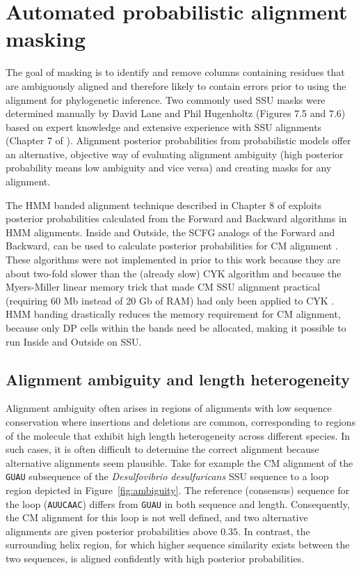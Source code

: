 \section{Automated probabilistic alignment masking}

The goal of masking is to identify and remove columns containing
residues that are ambiguously aligned and therefore likely to contain
errors prior to using the alignment for phylogenetic inference.  Two
commonly used SSU masks were determined manually by David Lane and
Phil Hugenholtz (Figures 7.5 and 7.6) based on expert knowledge and extensive
experience with SSU alignments (Chapter 7 of \cite{Nawrocki09b}). Alignment posterior
probabilities from probabilistic models offer an alternative,
objective way of evaluating alignment ambiguity (high posterior
probability means low ambiguity and vice versa) and creating masks for
any alignment.

The HMM banded alignment technique described in Chapter 8 of
\cite{Nawrocki09b} exploits
posterior probabilities calculated from the Forward and Backward
algorithms in HMM alignments. Inside and Outside, the
SCFG analogs of the Forward and Backward, can be used to calculate
posterior probabilities for CM alignment \cite{Durbin98}. These
algorithms were not implemented in  prior to this work
because they are about two-fold slower than the (already slow) CYK
algorithm and because the Myers-Miller linear memory trick that made
CM SSU alignment practical (requiring 60 Mb instead of 20 Gb of RAM)
had only been applied to CYK \cite{Eddy02b}. HMM banding drastically
reduces the memory requirement for CM alignment, because only DP cells
within the bands need be allocated, making it possible to run Inside
and Outside on SSU.

\subsection{Alignment ambiguity and length heterogeneity}

Alignment ambiguity often arises in regions of alignments with low
sequence conservation where insertions and deletions are common,
corresponding to regions of the molecule that exhibit high length
heterogeneity across different species. In such cases, it is often
difficult to determine the correct alignment because alternative
alignments seem plausible. Take for example the CM alignment
of the {\tt GUAU} subsequence of the \emph{Desulfovibrio
desulfuricans} SSU sequence to a loop region depicted in
Figure~\ref{fig:ambiguity}. The reference (consensus) sequence for the
loop ({\tt AUUCAAC}) differs from {\tt GUAU} in both sequence and
length. Consequently, the CM alignment for this loop is not well
defined, and two alternative alignments are given posterior
probabilities above $0.35$.  In contrast, the surrounding helix
region, for which higher sequence similarity exists between the two
sequences, is aligned confidently with high posterior probabilities.


